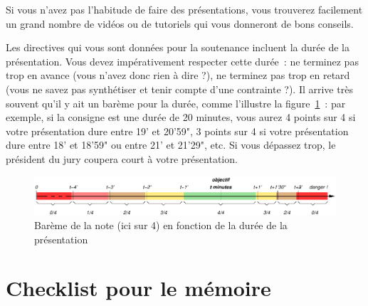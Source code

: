 \documentclass [twoside,openright,a4paper,11pt,french] {report}
\begin{document}
Si vous n'avez pas l'habitude de faire des présentations, vous trouverez
facilement un grand nombre de vidéos ou de tutoriels qui vous donneront
de bons conseils.

Les directives qui vous sont données pour la soutenance incluent la
durée de la présentation. Vous devez impérativement respecter cette
durée~: ne terminez pas trop en avance (vous n'avez donc rien à dire ?),
ne terminez pas trop en retard (vous ne savez pas synthétiser et tenir
compte d'une contrainte ?). Il arrive très souvent qu'il y ait un barème
pour la durée, comme l'illustre la figure~\ref{fig:duree-prez}~: par
exemple, si la consigne est une durée de 20 minutes, vous aurez 4 points
sur 4 si votre présentation dure entre 19' et 20'59", 3 points sur 4
si votre présentation dure entre 18' et 18'59" ou entre 21' et 21'29",
etc. Si vous dépassez trop, le président du jury coupera court à
votre présentation.

\begin {figure} [htbp]
    \label {fig:duree-prez}
    \begin {center}
	\includegraphics [width=\textwidth] {duree-prez.pdf}
    \end {center}
    \caption {Barème de la note (ici sur 4) en fonction de la durée
	de la présentation}
\end {figure}


\newenvironment{checklist}[1]{\vspace{-2.5ex}\section{#1}\vspace{-2ex}\begin{itemize}\vspace{-1ex}\small}{\end{itemize}}
\newcommand{\chkitem}[1]{\item [$\square$]#1}

\chapter {Checklist pour le mémoire}
    \label{checklist-mem}
\end{document}
